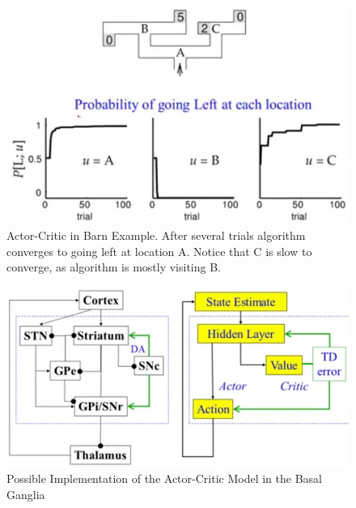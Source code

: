 \documentclass[]{article}
\begin{document}
\begin{figure}[H]
	\begin{center}
		\caption[Actor-Critic in Barn Example]{Actor-Critic in Barn Example. After several trials algorithm converges to going left at location A. Notice that C is slow to converge, as algorithm is mostly visiting B.}
		\includegraphics[width=\textwidth]{actor-critic-barn}
	\end{center}
\end{figure}

\begin{figure}[H]
	\begin{center}
		\caption[Possible Implementation of the Actor-Critic
		Model in the Basal Ganglia]{Possible Implementation of the Actor-Critic
			Model in the Basal Ganglia}
		\includegraphics[width=\textwidth]{actor-critic-mapping-brain}
	\end{center}
\end{figure}


\appendix

\printglossaries




\end{document}

